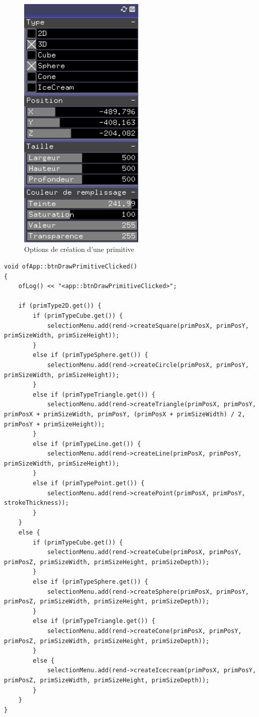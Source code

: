 \begin{figure}[h]
	\centering
	\includegraphics[width=6cm]{fig/creationPrimitive.png}
	\caption{Options de création d'une primitive}
	\label{fig:test}
\end{figure}

\newpage

\begin{lstlisting}
void ofApp::btnDrawPrimitiveClicked()
{
	ofLog() << "<app::btnDrawPrimitiveClicked>";
	
	if (primType2D.get()) {
		if (primTypeCube.get()) {
			selectionMenu.add(rend->createSquare(primPosX, primPosY, primSizeWidth, primSizeHeight));
		}
		else if (primTypeSphere.get()) {
			selectionMenu.add(rend->createCircle(primPosX, primPosY, primSizeWidth, primSizeHeight));
		}
		else if (primTypeTriangle.get()) {
			selectionMenu.add(rend->createTriangle(primPosX, primPosY, primPosX + primSizeWidth, primPosY, (primPosX + primSizeWidth) / 2, primPosY + primSizeHeight));
		}
		else if (primTypeLine.get()) {
			selectionMenu.add(rend->createLine(primPosX, primPosY, primSizeWidth, primSizeHeight));
		}
		else if (primTypePoint.get()) {
			selectionMenu.add(rend->createPoint(primPosX, primPosY, strokeThickness));
		}
	}
	else {
		if (primTypeCube.get()) {
			selectionMenu.add(rend->createCube(primPosX, primPosY, primPosZ, primSizeWidth, primSizeHeight, primSizeDepth));
		}
		else if (primTypeSphere.get()) {
			selectionMenu.add(rend->createSphere(primPosX, primPosY, primPosZ, primSizeWidth, primSizeHeight, primSizeDepth));
		}
		else if (primTypeTriangle.get()) {
			selectionMenu.add(rend->createCone(primPosX, primPosY, primPosZ, primSizeWidth, primSizeHeight, primSizeDepth));
		}
		else {
			selectionMenu.add(rend->createIcecream(primPosX, primPosY, primPosZ, primSizeWidth, primSizeHeight, primSizeDepth));
		}
	}
}
\end{lstlisting}

